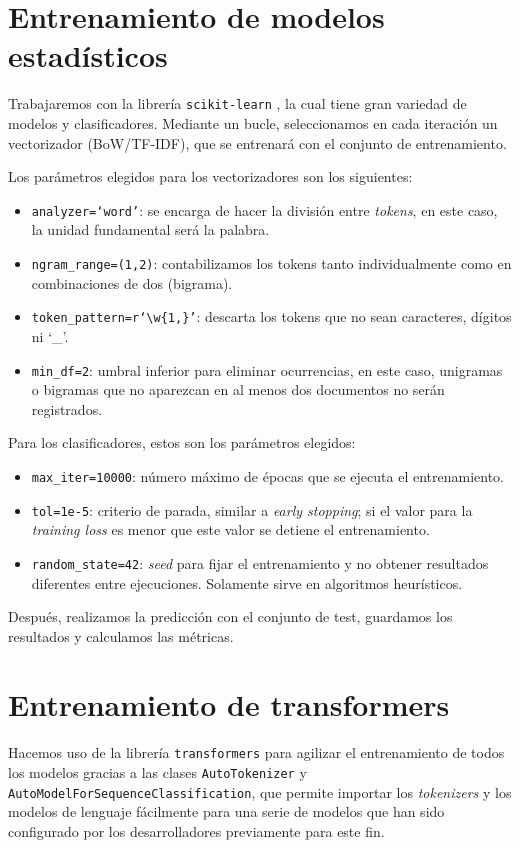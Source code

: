 \label{sec:metodologia}

\section{Entrenamiento de modelos estadísticos}

Trabajaremos con la librería \texttt{scikit-learn} \citep{scikit}, la cual tiene gran variedad de modelos y clasificadores. Mediante un bucle, seleccionamos en cada iteración un vectorizador (BoW/TF-IDF), que se entrenará con el conjunto de entrenamiento. 

Los parámetros elegidos para los vectorizadores son los siguientes:
\begin{itemize}
    \item \texttt{analyzer=`word'}: se encarga de hacer la división entre \textit{tokens}, en este caso, la unidad fundamental será la palabra.
    \item \texttt{ngram\_range=(1,2)}: contabilizamos los tokens tanto individualmente como en combinaciones de dos (bigrama).
    \item \texttt{token\_pattern=r`\textbackslash w\{1,\}'}: descarta los tokens que no sean caracteres, dígitos ni `\_'.
    \item \texttt{min\_df=2}: umbral inferior para  eliminar ocurrencias, en este caso, unigramas o bigramas que no aparezcan en al menos dos documentos no serán registrados.
\end{itemize}

Para los clasificadores, estos son los parámetros elegidos:
\begin{itemize}
    \item \texttt{max\_iter=10000}: número máximo de épocas que se ejecuta el entrenamiento.
    \item \texttt{tol=1e-5}: criterio de parada, similar a \textit{early stopping}; si el valor para la \textit{training loss} es menor que este valor se detiene el entrenamiento.
    \item \texttt{random\_state=42}: \textit{seed} para fijar el entrenamiento y no obtener resultados diferentes entre ejecuciones. Solamente sirve en algoritmos heurísticos.
\end{itemize}

Después, realizamos la predicción con el conjunto de test, guardamos los resultados y calculamos las métricas.


\section{Entrenamiento de transformers}
Hacemos uso de la librería \texttt{transformers} \citep{transformers} para agilizar el entrenamiento de todos los modelos gracias a las clases \texttt{AutoTokenizer} y \texttt{AutoModelForSequence\-Classification}, que permite importar los \textit{tokenizers} y los modelos de lenguaje fácilmente para una serie de modelos que han sido configurado por los desarrolladores previamente para este fin. 

